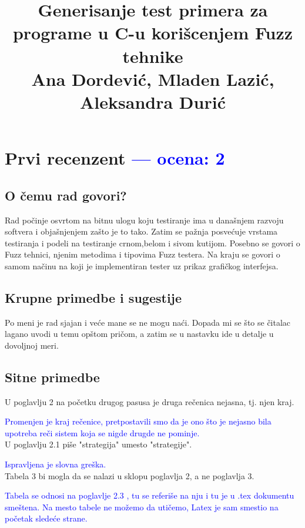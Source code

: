 \documentclass[a4paper]{report}
\newcommand{\odgovor}[1]{\textcolor{blue}{#1}}
\begin{document}
\title{Generisanje test primera za programe u C-u korišcenjem Fuzz tehnike\\ \small{Ana Dordević, Mladen Lazić, Aleksandra Durić}}

\maketitle
\tableofcontents


\chapter{Prvi recenzent \odgovor{--- ocena: 2} }
\section{O čemu rad govori?}
Rad počinje osvrtom na bitnu ulogu koju testiranje ima u današnjem razvoju softvera i objašnjenjem zašto je to tako. Zatim se pažnja posvećuje vrstama testiranja i podeli na testiranje crnom,belom i sivom kutijom. Posebno se govori o Fuzz tehnici, njenim metodima i tipovima Fuzz testera. Na kraju se govori o samom načinu na koji je implementiran tester uz prikaz grafičkog interfejsa.  

\section{Krupne primedbe i sugestije}
Po meni je rad sjajan i veće mane se ne mogu naći. Dopada mi se što se čitalac lagano uvodi u temu opštom pričom, a zatim se u nastavku ide u detalje u dovoljnoj meri. 

\section{Sitne primedbe}
U poglavlju 2 na početku drugog pasusa je druga rečenica nejasna, tj. njen kraj. 

\odgovor{
Promenjen je kraj rečenice, pretpostavili smo da je ono što je nejasno bila upotreba reči sistem koja se nigde drugde ne pominje.} \\

U poglavlju 2.1 piše "strategija" umesto "strategije".

\odgovor {
Ispravljena je slovna greška.} \\

Tabela 3 bi mogla da se nalazi u sklopu poglavlja 2, a ne poglavlja 3.

\odgovor {
Tabela se odnosi na poglavlje 2.3 , tu se referiše na nju i tu je u .tex dokumentu smeštena. Na mesto tabele ne možemo da utičemo, Latex je sam smestio na početak sledeće strane.
}
\end{document}

